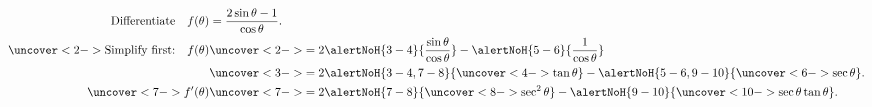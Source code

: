 \begin{frame}
\begin{example}
\begin{align*}
\text{Differentiate} \quad f(\theta) & = \frac{2\sin \theta - 1}{\cos \theta}. \\
\uncover<2->{%
\text{Simplify first:}\quad f(\theta)
}%
& \uncover<2->{%
= 2\alertNoH{ 3-4}{\frac{\sin \theta}{\cos\theta}} - \alertNoH{ 5-6}{\frac{1}{\cos\theta}} %
}\\%
& \uncover<3->{%
= 2\alertNoH{ 3-4,7-8}{\uncover<4->{\tan \theta}} - \alertNoH{ 5-6,9-10}{\uncover<6->{\sec \theta}}. %
}\\%
\uncover<7->{%
f'(\theta)
}%
& \uncover<7->{%
= 2\alertNoH{ 7-8}{\uncover<8->{\sec^2\theta}} - \alertNoH{ 9-10}{\uncover<10->{\sec \theta\tan\theta}}. %
}%
\end{align*}
\end{example}
\end{frame}
